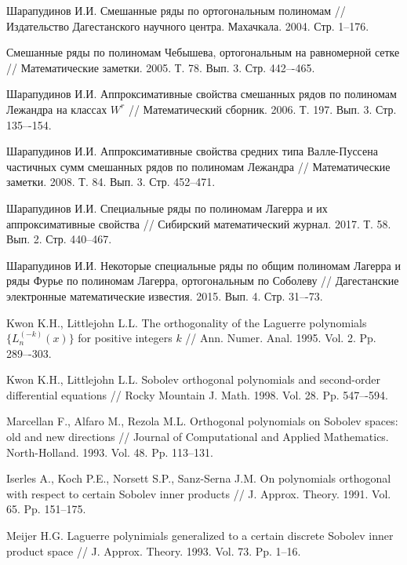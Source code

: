 \begin{thebibliography}{999}
 {Шарапудинов И.И.}
Смешанные ряды по ортогональным полиномам // Издательство Дагестанского научного центра. Махачкала. 2004. Стр. 1--176.

Смешанные ряды по полиномам Чебышева, ортогональным на равномерной сетке // Математические заметки. 2005. Т. 78. Вып. 3. Стр. 442–-465.

 {Шарапудинов И.И.}
Аппроксимативные свойства смешанных рядов по полиномам Лежандра на классах $W^r$ // Математический сборник. 2006. Т. 197. Вып. 3. Стр. 135–-154.

 {Шарапудинов И.И.}
Аппроксимативные свойства средних типа Валле-Пуссена частичных сумм смешанных рядов по полиномам Лежандра // Математические заметки. 2008. Т. 84. Вып. 3. Стр. 452--471.

 {Шарапудинов И.И.}
Специальные ряды по полиномам Лагерра и их аппроксимативные свойства // Сибирский математический журнал. 2017. Т. 58. Вып. 2. Стр. 440--467.

 {Шарапудинов И.И.}
Некоторые специальные ряды по общим полиномам Лагерра и ряды Фурье по полиномам Лагерра, ортогональным по Соболеву //  Дагестанские электронные математические известия. 2015. Вып. 4. Стр. 31–-73.

 {Kwon K.H., Littlejohn L.L.}
The orthogonality of the Laguerre polynomials $\{L_n^{(-k)}(x)\}$ for positive integers $k$ // Ann. Numer. Anal. 1995. Vol. 2. Pp. 289–-303.

 {Kwon K.H., Littlejohn L.L.}
Sobolev orthogonal polynomials and second-order differential equations // Rocky Mountain J. Math. 1998. Vol. 28. Pp. 547–-594.

 {Marcellan F., Alfaro M., Rezola M.L.}
Orthogonal polynomials on Sobolev spaces: old and new directions // Journal of Computational and Applied Mathematics. North-Holland. 1993. Vol. 48. Pp. 113--131.

 {Iserles A., Koch P.E., Norsett S.P., Sanz-Serna J.M.}
On polynomials  orthogonal  with respect  to certain Sobolev inner products // J. Approx. Theory. 1991. Vol. 65. Pp. 151--175.

 {Meijer H.G.}
Laguerre polynimials generalized to a certain discrete Sobolev inner product space // J. Approx. Theory. 1993. Vol. 73. Pp. 1--16.


\end{thebibliography}
